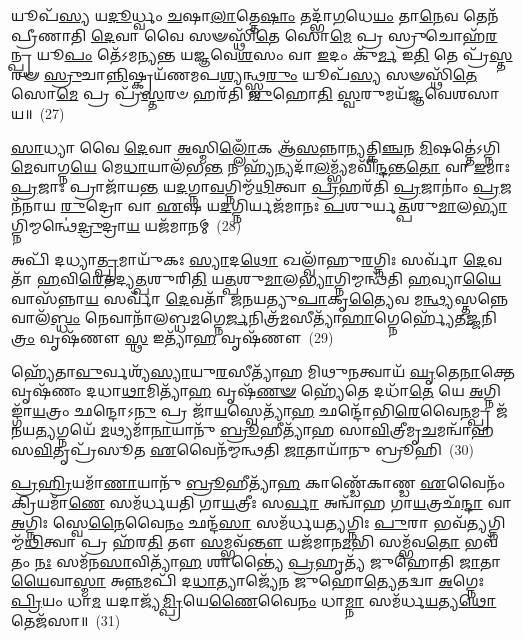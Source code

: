 𑌯𑍂𑌪᳴\-\ul{𑌸𑍍𑌯} 𑌯\-\ul{𑌦𑍂}\-𑌰𑍍𑌧𑍍𑌵𑌂 \ul{𑌚}\-𑌷𑌾\-\ul{𑌲𑌾}\-𑌤𑍍𑌤𑍇\-\ul{𑌷𑌾𑌂} 𑌤𑌦𑍍𑌭𑌾᳴\-\ul{𑌗}\-𑌧𑍇\-\ul{𑌯𑌂} 𑌤𑌾\-\ul{𑌨𑍇}\-𑌵 𑌤𑍇𑌨᳴ 𑌪𑍍𑌰𑍀𑌣𑌾𑌤𑌿 \ul{𑌦𑍇}\-𑌵𑌾 𑌵𑍈 𑌸𑍟𑌸𑍍𑌥𑌿᳴\-\ul{𑌤𑍇} 𑌸𑍋\-\ul{𑌮𑍇} 𑌪𑍍𑌰 𑌸𑍍𑌰𑍁𑌚𑍋𑌹᳴\-\ul{𑌰}\-𑌨𑍍𑌪𑍍𑌰 𑌯𑍂\-\ul{𑌪𑌂} 𑌤𑍇᳴\-𑌽𑌮𑌨𑍍𑌯𑌨𑍍𑌤 𑌯𑌜𑍍𑌞𑌵𑍇\-\ul{𑌶}\-𑌸𑌂 𑌵𑌾 \ul{𑌇}\-𑌦𑌂 𑌕𑍁᳴\-\ul{𑌰𑍍𑌮} 𑌇\-\ul{𑌤𑌿} 𑌤𑍇 𑌪𑍍𑌰᳴\-\ul{𑌸𑍍𑌤}\-𑌰𑍟 \ul{𑌸𑍍𑌰𑍁}\-𑌚𑌾\-\ul{𑌨𑍍𑌨𑌿}\-𑌷𑍍𑌕𑍍𑌰𑌯᳴𑌣𑌮𑌪\-\ul{𑌶𑍍𑌯}\-𑌨𑍍𑌥𑍍𑌸𑍍𑌵\-\ul{𑌰𑍁𑌂} 𑌯𑍂𑌪᳴\-\ul{𑌸𑍍𑌯} 𑌸𑍟𑌸𑍍𑌥𑌿᳴\-\ul{𑌤𑍇} 𑌸𑍋\-\ul{𑌮𑍇} 𑌪𑍍𑌰 𑌪𑍍𑌰᳴\-\ul{𑌸𑍍𑌤}\-𑌰𑍞 𑌹𑌰᳴𑌤𑌿 \ul{𑌜𑍁}\-𑌹𑍋\-\ul{𑌤𑌿} \ul{𑌸𑍍𑌵}\-𑌰𑍁𑌮𑌯᳴𑌜𑍍𑌞𑌵𑍇𑌶𑌸𑌾𑌯॥~(27)

{}%

\-\ul{𑌸𑌾}\-𑌧𑍍𑌯𑌾 𑌵𑍈 \ul{𑌦𑍇}\-𑌵𑌾 \ul{𑌅}\-𑌸𑍍𑌮𑌿\-\ul{𑌲𑍍𑌲𑍋𑌁}\-𑌕 𑌆᳴\-\ul{𑌸}\-𑌨𑍍𑌨𑌾𑌨𑍍𑌯𑌤𑍍𑌕𑌿\-\ul{𑌞𑍍𑌚}\-𑌨 \ul{𑌮𑌿}\-𑌷𑌤𑍍𑌤𑍇॑\-𑌽𑌗𑍍𑌨𑌿\-\ul{𑌮𑍇}\-𑌵𑌾𑌗𑍍𑌨\-\ul{𑌯𑍇} 𑌮𑍇\-\ul{𑌧𑌾}\-𑌯𑌾𑌲᳴𑌭\-\ul{𑌨𑍍𑌤} 𑌨 𑌹𑍍𑌯᳴𑌨𑍍𑌯𑌦𑌾᳴\-\ul{𑌲}\-𑌮𑍍𑌭𑍍𑌯᳴𑌮𑌵𑌿᳴\-\ul{𑌨𑍍𑌦}\-𑌨𑍍𑌤\-\ul{𑌤𑍋} 𑌵𑌾 \ul{𑌇}\-𑌮𑌾𑌃 \ul{𑌪𑍍𑌰}\-𑌜𑌾𑌃 𑌪𑍍𑌰𑌾𑌜𑌾᳴𑌯\-\ul{𑌨𑍍𑌤} 𑌯\-\ul{𑌦}\-𑌗𑍍𑌨𑌾\-\ul{𑌵}\-𑌗𑍍𑌨𑌿𑌮𑍍𑌮᳴\-\ul{𑌥𑌿}\-𑌤𑍍𑌵𑌾 \ul{𑌪𑍍𑌰}\-𑌹𑌰᳴𑌤𑌿 \ul{𑌪𑍍𑌰}\-𑌜𑌾𑌨𑌾𑌂॑ \ul{𑌪𑍍𑌰}\-𑌜𑌨᳴𑌨𑌾𑌯 \ul{𑌰𑍁}\-𑌦𑍍𑌰𑍋 𑌵𑌾 \ul{𑌏}\-𑌷 𑌯\-\ul{𑌦}\-𑌗𑍍𑌨𑌿𑌰𑍍𑌯𑌜᳴𑌮𑌾𑌨𑌃 \ul{𑌪}\-𑌶𑍁𑌰𑍍𑌯\-\ul{𑌤𑍍𑌪}\-𑌶𑍁\-\ul{𑌮𑌾}\-𑌲\-\ul{𑌭𑍍𑌯𑌾}\-𑌗𑍍𑌨𑌿𑌮𑍍𑌮𑌨𑍍𑌥𑍇॑\-\ul{𑌦𑍍𑌰𑍁}\-𑌦𑍍𑌰𑌾\-\ul{𑌯} 𑌯𑌜᳴𑌮𑌾𑌨𑌮𑍍~(28)

𑌅𑌪𑌿᳴ 𑌦𑌧𑍍𑌯𑌾\-\ul{𑌤𑍍𑌪𑍍𑌰}\-𑌮𑌾𑌯𑍁᳴𑌕𑌃 \ul{𑌸𑍍𑌯𑌾}\-𑌦\-\ul{𑌥𑍋} 𑌖𑌲𑍍𑌵𑌾᳴𑌹𑍁\-\ul{𑌰}\-𑌗𑍍𑌨𑌿𑌃 𑌸𑌰𑍍𑌵𑌾᳴ \ul{𑌦𑍇}\-𑌵𑌤𑌾᳴ \ul{𑌹}\-𑌵𑌿\-\ul{𑌰𑍇}\-𑌤𑌦𑍍𑌯\-\ul{𑌤𑍍𑌪}\-𑌶𑍁𑌰𑌿\-\ul{𑌤𑌿} 𑌯\-\ul{𑌤𑍍𑌪}\-𑌶𑍁\-\ul{𑌮𑌾}\-𑌲\-\ul{𑌭𑍍𑌯𑌾}\-𑌗𑍍𑌨𑌿𑌮𑍍𑌮𑌨𑍍𑌥᳴𑌤𑌿 \ul{𑌹}\-𑌵𑍍𑌯𑌾\-\ul{𑌯𑍈}\-𑌵𑌾𑌸᳴𑌨𑍍𑌨𑌾\-\ul{𑌯} 𑌸𑌰𑍍𑌵𑌾᳴ \ul{𑌦𑍇}\-𑌵𑌤𑌾᳴ 𑌜𑌨𑌯𑌤𑍍𑌯𑍁\-\ul{𑌪𑌾}\-𑌕𑍃\-\ul{𑌤𑍍𑌯𑍈}\-𑌵 𑌮\-\ul{𑌨𑍍𑌥𑍍𑌯}\-𑌸𑍍𑌤𑌨𑍍𑌨𑍇𑌵𑌾𑌲᳴\-\ul{𑌬𑍍𑌧𑌂} 𑌨𑍇𑌵𑌾𑌨𑌾᳴𑌲𑌬𑍍𑌧\-\ul{𑌮}\-𑌗𑍍𑌨𑍇\-\ul{𑌰𑍍𑌜}\-𑌨𑌿𑌤𑍍𑌰᳴\-\ul{𑌮}\-𑌸𑍀𑌤𑍍𑌯𑌾᳴\-\ul{𑌹𑌾}\-𑌗𑍍𑌨𑍇𑌰𑍍\mbox{}𑌹𑍍𑌯𑍇᳴𑌤\-\ul{𑌜𑍍𑌜}\-𑌨𑌿\-\ul{𑌤𑍍𑌰𑌂} 𑌵𑍃𑌷᳴𑌣𑍗 \ul{𑌸𑍍𑌥} 𑌇𑌤𑍍𑌯𑌾᳴\-\ul{𑌹} 𑌵𑍃𑌷᳴𑌣𑍗~(29)

𑌹𑍍𑌯𑍇᳴𑌤𑌾\-\ul{𑌵𑍁}\-𑌰𑍍𑌵𑌶𑍍𑌯᳴\-\ul{𑌸𑍍𑌯𑌾}\-𑌯𑍁\-\ul{𑌰}\-𑌸𑍀𑌤𑍍𑌯𑌾᳴𑌹 𑌮𑌿𑌥𑍁\-\ul{𑌨}\-𑌤𑍍𑌵𑌾𑌯᳴ \ul{𑌘𑍃}\-𑌤𑍇\-\ul{𑌨𑌾}\-𑌕𑍍𑌤𑍇 𑌵𑍃𑌷᳴𑌣𑌂 𑌦𑌧𑌾\-\ul{𑌥𑌾}\-𑌮𑌿𑌤𑍍𑌯𑌾᳴\-\ul{𑌹} 𑌵𑍃𑌷᳴\-\ul{𑌣}\-\-\ul{𑍟} 𑌹𑍍𑌯𑍇᳴𑌤𑍇 𑌦𑌧𑌾᳴\-\ul{𑌤𑍇} 𑌯𑍇 \ul{𑌅}\-𑌗𑍍𑌨𑌿𑌙𑍍𑌗𑌾᳴\-\ul{𑌯}\-𑌤𑍍𑌰𑌂 𑌛𑌨𑍍𑌦𑍋\-𑌽\-\ul{𑌨𑍁} 𑌪𑍍𑌰 𑌜𑌾᳴\-\ul{𑌯}\-𑌸𑍍𑌵𑍇𑌤𑍍𑌯𑌾᳴\-\ul{𑌹} 𑌛𑌨𑍍𑌦𑍋᳴𑌭𑌿\-\ul{𑌰𑍇}\-𑌵𑍈\-\ul{𑌨}\-𑌮𑍍𑌪𑍍𑌰 𑌜᳴𑌨𑌯\-\ul{𑌤𑍍𑌯}\-𑌗𑍍𑌨𑌯𑍇᳴ \ul{𑌮}\-𑌥𑍍𑌯𑌮𑌾᳴\-\ul{𑌨𑌾}\-𑌯𑌾𑌨𑍁᳴ \ul{𑌬𑍍𑌰𑍂}\-𑌹𑍀𑌤𑍍𑌯𑌾᳴𑌹 𑌸𑌾\-\ul{𑌵𑌿}\-𑌤𑍍𑌰𑍀𑌮𑍃\-\ul{𑌚}\-𑌮𑌨𑍍𑌵𑌾᳴𑌹 𑌸\-\ul{𑌵𑌿}\-𑌤𑍃𑌪𑍍𑌰᳴𑌸𑍂𑌤 \ul{𑌏}\-𑌵𑍈𑌨᳴𑌮𑍍𑌮𑌨𑍍𑌥𑌤𑌿 \ul{𑌜𑌾}\-𑌤𑌾𑌯𑌾᳴𑌨𑍁 𑌬𑍍𑌰𑍂𑌹𑌿~(30)

\-\ul{𑌪𑍍𑌰}\-\-\ul{𑌹𑍍𑌰𑌿}\-𑌯𑌮𑌾᳴\-\ul{𑌣𑌾}\-𑌯𑌾𑌨𑍁᳴ \ul{𑌬𑍍𑌰𑍂}\-𑌹𑍀𑌤𑍍𑌯𑌾᳴\-\ul{𑌹} 𑌕𑌾𑌣𑍍𑌡𑍇᳴𑌕𑌾𑌣𑍍𑌡 \ul{𑌏}\-𑌵𑍈𑌨𑌂᳴ 𑌕𑍍𑌰𑌿𑌯𑌮𑌾᳴\-\ul{𑌣𑍇} 𑌸𑌮᳴𑌰𑍍𑌧𑌯𑌤𑌿 𑌗𑌾\-\ul{𑌯}\-𑌤𑍍𑌰𑍀𑌃 𑌸\-\ul{𑌰𑍍𑌵𑌾} 𑌅𑌨𑍍𑌵𑌾᳴𑌹 𑌗𑌾\-\ul{𑌯}\-𑌤𑍍𑌰𑌛᳴\-\ul{𑌨𑍍𑌦𑌾} 𑌵𑌾 \ul{𑌅}\-𑌗𑍍𑌨𑌿𑌃 𑌸𑍍𑌵𑍇\-\ul{𑌨𑍈}\-𑌵𑍈\-\ul{𑌨𑌂} 𑌛𑌨𑍍𑌦᳴\-\ul{𑌸𑌾} 𑌸𑌮᳴𑌰𑍍𑌧𑌯\-\ul{𑌤𑍍𑌯}\-𑌗𑍍𑌨𑌿𑌃 \ul{𑌪𑍁}\-𑌰𑌾 𑌭𑌵᳴\-\ul{𑌤𑍍𑌯}\-𑌗𑍍𑌨𑌿𑌮𑍍𑌮᳴\-\ul{𑌥𑌿}\-𑌤𑍍𑌵𑌾 𑌪𑍍𑌰 𑌹᳴𑌰\-\ul{𑌤𑌿} 𑌤𑍗 \ul{𑌸}\-𑌮𑍍𑌭𑌵᳴\-\ul{𑌨𑍍𑌤𑍗} 𑌯𑌜᳴𑌮𑌾𑌨\-\ul{𑌮}\-𑌭𑌿 𑌸𑌮𑍍𑌭᳴𑌵\-\ul{𑌤𑍋} 𑌭𑌵᳴𑌤𑌂 \ul{𑌨𑌃} 𑌸𑌮᳴𑌨\-\ul{𑌸𑌾}\-𑌵𑌿𑌤𑍍𑌯𑌾᳴\-\ul{𑌹} 𑌶𑌾𑌨𑍍𑌤𑍍𑌯𑍈॑ \ul{𑌪𑍍𑌰}\-𑌹𑍃𑌤𑍍𑌯᳴ 𑌜𑍁𑌹𑍋𑌤𑌿 \ul{𑌜𑌾}\-𑌤𑌾\-\ul{𑌯𑍈}\-𑌵𑌾\-\ul{𑌸𑍍𑌮𑌾} 𑌅\-\ul{𑌨𑍍𑌨}\-𑌮𑌪𑌿᳴ 𑌦\-\ul{𑌧𑌾}\-𑌤𑍍𑌯𑌾𑌜𑍍𑌯𑍇᳴𑌨 𑌜𑍁𑌹𑍋\-\ul{𑌤𑍍𑌯𑍇}\-𑌤𑌦𑍍𑌵𑌾 \ul{𑌅}\-𑌗𑍍𑌨𑍇𑌃 \ul{𑌪𑍍𑌰𑌿}\-𑌯𑌂 𑌧𑌾\-\ul{𑌮} 𑌯𑌦𑌾𑌜𑍍𑌯᳴\-\ul{𑌮𑍍𑌪𑍍𑌰𑌿}\-𑌯𑍇\-\ul{𑌣𑍈}\-𑌵𑍈\-\ul{𑌨𑌂} 𑌧𑌾\-\ul{𑌮𑍍𑌨𑌾} 𑌸𑌮᳴𑌰𑍍𑌧\-\ul{𑌯}\-𑌤𑍍𑌯\-\ul{𑌥𑍋} 𑌤𑍇𑌜᳴𑌸𑌾॥~(31)

